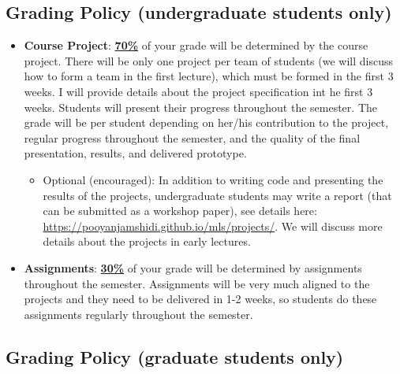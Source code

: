 \documentclass[11pt]{article}
\begin{document}
\subsection*{Grading Policy (undergraduate students only)}
\begin{itemize}
   \item \textbf{Course Project}: \underline{\textbf{70\%}} of your grade will be determined by the course project. There will be only one project per team of students (we will discuss how to form a team in the first lecture), which must be formed in the first 3 weeks. I will provide details about the project specification int he first 3 weeks. Students will present their progress throughout the semester. The grade will be per student depending on her/his contribution to the project, regular progress throughout the semester, and the quality of the final presentation, results, and delivered prototype. 
\begin{itemize}
   \item Optional (encouraged): In addition to writing code and presenting the results of the projects, undergraduate students may write a report (that can be submitted as a workshop paper), see details here: \url{https://pooyanjamshidi.github.io/mls/projects/}. We will discuss more details about the projects in early lectures.
\end{itemize}
  \item \textbf{Assignments}: \underline{\textbf{30\%}} of your grade will be determined by assignments throughout the semester. Assignments will be very much aligned to the projects and they need to be delivered in 1-2 weeks, so students do these assignments regularly throughout the semester.

\end{itemize}

\subsection*{Grading Policy (graduate students only)}
\end{document}
